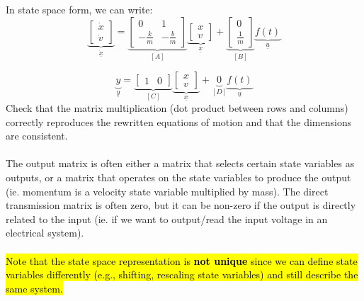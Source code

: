 ﻿\documentclass[12pt]{article}
\begin{document}
In state space form, we can write:
\[
\underbrace{
\begin{bmatrix}
\dot{x}\\
\dot{v}
\end{bmatrix}
}_{\dot{\underline{x}}}
=
\underbrace{
\begin{bmatrix}
0 & 1\\
-\frac{k}{m} & -\frac{b}{m}
\end{bmatrix}
}_{[A]}
\underbrace{
\begin{bmatrix}
x\\
v
\end{bmatrix}
}_{\underline{x}}
+
\underbrace{
\begin{bmatrix}
0\\
\frac{1}{m}
\end{bmatrix}
}_{[B]}
\underbrace{f(t)}_{\underline{u}}
\]

\[
\underbrace{y}_{\underline{y}}
=
\underbrace{
\begin{bmatrix}
1 & 0
\end{bmatrix}
}_{[C]}
\underbrace{
\begin{bmatrix}
x\\
v
\end{bmatrix}
}_{\underline{x}}
+
\underbrace{0}_{[D]}
\underbrace{f(t)}_{\underline{u}}
\]
Check that the matrix multiplication (dot product between rows and columns) correctly reproduces the rewritten equations of motion and that the dimensions are consistent.\\\\
The output matrix is often either a matrix that selects certain state variables as outputs, or a matrix that operates on the state variables to produce the output (ie. momentum is a velocity state variable multiplied by mass). The direct transmission matrix is often zero, but it can be non-zero if the output is directly related to the input (ie. if we want to output/read the input voltage in an electrical system).\\\\
\hl{Note that the state space representation is \textbf{not unique} since we can define state variables differently (e.g., shifting, rescaling state variables) and still describe the same system.}
\end{document}
